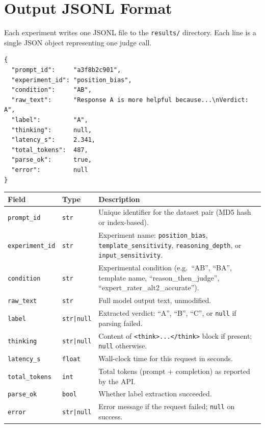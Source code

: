 \documentclass[11pt,a4paper]{article}
\begin{document}
\newpage
\section{Output JSONL Format}\label{sec:output}

\begin{conceptbox}
Each experiment writes one JSONL file to the \texttt{results/} directory.
Each line is a single JSON object representing one judge call.
\end{conceptbox}

\begin{codebox}
\begin{lstlisting}
{
  "prompt_id":     "a3f8b2c901",
  "experiment_id": "position_bias",
  "condition":     "AB",
  "raw_text":      "Response A is more helpful because...\nVerdict: A",
  "label":         "A",
  "thinking":      null,
  "latency_s":     2.341,
  "total_tokens":  487,
  "parse_ok":      true,
  "error":         null
}
\end{lstlisting}
\end{codebox}

\begin{center}
\small
\begin{longtable}{llp{7cm}}
  \toprule
  \textbf{Field} & \textbf{Type} & \textbf{Description} \\
  \midrule
  \endhead
  \texttt{prompt\_id} & \texttt{str} &
    Unique identifier for the dataset pair (MD5 hash or index-based). \\
  \texttt{experiment\_id} & \texttt{str} &
    Experiment name: \texttt{position\_bias}, \texttt{template\_sensitivity},
    \texttt{reasoning\_depth}, or \texttt{input\_sensitivity}. \\
  \texttt{condition} & \texttt{str} &
    Experimental condition (e.g.\ ``AB'', ``BA'', template name,
    ``reason\_then\_judge'', ``expert\_rater\_alt2\_accurate''). \\
  \texttt{raw\_text} & \texttt{str} &
    Full model output text, unmodified. \\
  \texttt{label} & \texttt{str|null} &
    Extracted verdict: ``A'', ``B'', ``C'', or \texttt{null} if parsing failed. \\
  \texttt{thinking} & \texttt{str|null} &
    Content of \texttt{<think>...</think>} block if present; \texttt{null}
    otherwise. \\
  \texttt{latency\_s} & \texttt{float} &
    Wall-clock time for this request in seconds. \\
  \texttt{total\_tokens} & \texttt{int} &
    Total tokens (prompt + completion) as reported by the API. \\
  \texttt{parse\_ok} & \texttt{bool} &
    Whether label extraction succeeded. \\
  \texttt{error} & \texttt{str|null} &
    Error message if the request failed; \texttt{null} on success. \\
  \bottomrule
\end{longtable}
\end{center}
\end{document}
